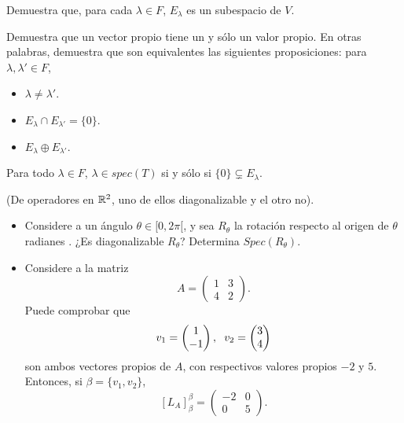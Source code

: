  Demuestra que, para cada $\lambda \in F$,
$E_{\lambda}$ es un subespacio de $V$.

 Demuestra que un vector propio tiene un y sólo
un valor propio. En otras palabras, demuestra que son equivalentes 
las siguientes proposiciones: para $\lambda, \lambda' \in F$,
\begin{itemize}
	\item $\lambda \neq \lambda'$.
	\item $E_{\lambda} \cap E_{\lambda'} = \{0\}$.
	\item $E_{\lambda} \oplus E_{\lambda'}$.
\end{itemize}

\begin{obs}
	Para todo $\lambda \in F$, 
	$\lambda \in spec(T)$ si y sólo si $\{ 0 \} \subsetneq E_{\lambda}$.
\end{obs}

\begin{ejem} 
\label{ejem: operadores diagn y no diagn}	
(De operadores en $\mathbb{R}^{2}$, uno de ellos diagonalizable
y el otro no).
\begin{itemize}
	\item Considere a un ángulo $\theta \in [0, 2 \pi[$, y sea
	$R_{\theta}$ la rotación respecto al origen de $\theta$
	radianes . ¿Es diagonalizable $R_{\theta}$?
	Determina $Spec(R_{\theta})$.
	
	\item Considere a la matriz
	\[
	A = \begin{pmatrix}
	1 & 3 \\ 4 & 2
	\end{pmatrix}.
	\]
	Puede comprobar que 
	\[
	v_{1} = \begin{pmatrix}
	1 \\ -1
	\end{pmatrix}, \hspace{0.2cm}
	v_{2} = \begin{pmatrix}
	3 \\ 4
	\end{pmatrix}
	\]
	son ambos vectores propios de $A$, con respectivos valores propios
	$-2$ y $5$. Entonces, si $\beta = \{ v_{1}, v_{2} \}$, 
	\[
	[L_{A}]_{\beta}^{\beta} = \begin{pmatrix}
	-2 & 0 \\ 0 & 5
	\end{pmatrix}.
	\]
\end{itemize}
\end{ejem}

